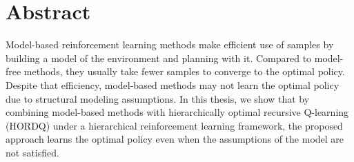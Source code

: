 






\chapter{Abstract}

Model-based reinforcement learning methods make efficient use of samples by
building a model of the environment and planning with it. Compared to
model-free methods, they usually take fewer samples to converge to the optimal
policy. Despite that efficiency, model-based methods may not learn the optimal
policy due to structural modeling assumptions. In this thesis, we show that by
combining model-based methods with hierarchically optimal recursive Q-learning (HORDQ)
under a hierarchical reinforcement learning framework, the proposed approach
learns the optimal policy even when the assumptions of the model are not
satisfied.

\vfill
\begin{center}
\begin{sf}
\end{sf}
\end{center}
